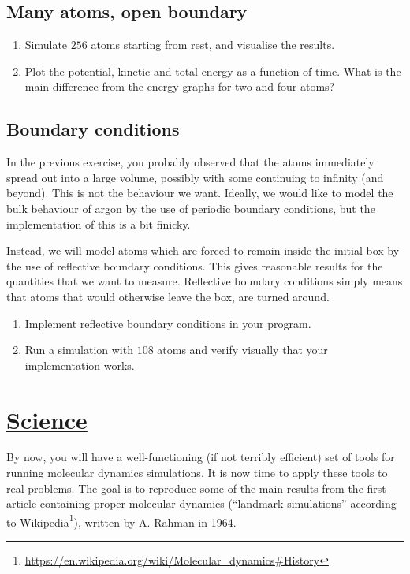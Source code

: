 \documentclass[11pt,british,a4paper]{report}
\begin{document}
\subsection{Many atoms, open boundary}
\begin{enumerate}[label=\roman*.]
    \item Simulate \(256\) atoms starting from rest, and visualise the results.
    \item Plot the potential, kinetic and total energy as a function of time. What is the main difference from the energy graphs for two and four atoms?
\end{enumerate}

\subsection{Boundary conditions}
In the previous exercise, you probably observed that the atoms immediately spread out into a large volume, possibly with some continuing to infinity (and beyond). This is not the behaviour we want. Ideally, we would like to model the bulk behaviour of argon by the use of periodic boundary conditions, but the implementation of this is a bit finicky.

Instead, we will model atoms which are forced to remain inside the initial box by the use of reflective boundary conditions. This gives reasonable results for the quantities that we want to measure.
Reflective boundary conditions simply means that atoms that would otherwise leave the box, are turned around.
\begin{enumerate}[label=\roman*.]
    \item Implement reflective boundary conditions in your program.
    \item Run a simulation with \(108\) atoms and verify visually that your implementation works.
\end{enumerate}

\section{\underline{Science}}
By now, you will have a well-functioning (if not terribly efficient) set of tools for running molecular dynamics simulations. It is now time to apply these tools to real problems. The goal is to reproduce some of the main results from the first article containing proper molecular dynamics (``landmark simulations'' according to Wikipedia\footnote{\url{https://en.wikipedia.org/wiki/Molecular_dynamics\#History}}), written by A. Rahman in 1964\cite{Rahman_1964}.
\end{document}

